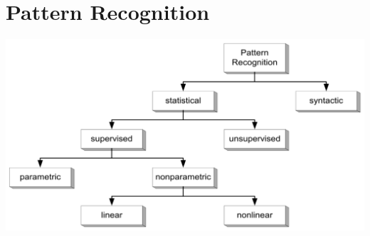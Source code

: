 \section{Pattern Recognition}
\label{sect:pattern-recognition}

\includegraphics[scale=0.3]{pattern-recognition-partitioning}
